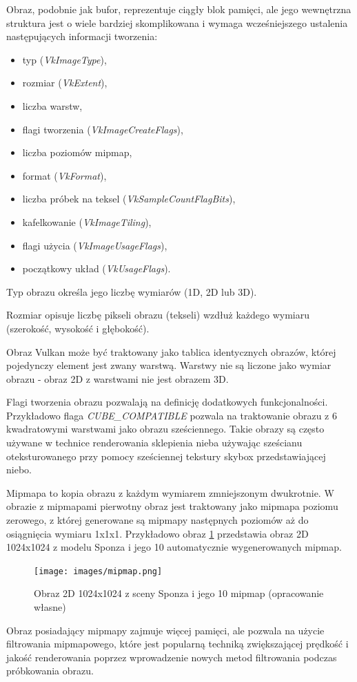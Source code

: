 Obraz, podobnie jak bufor, reprezentuje ciągły blok pamięci, ale jego wewnętrzna struktura jest o wiele bardziej skomplikowana i wymaga wcześniejszego ustalenia następujących informacji tworzenia:
\begin{itemize}
	\item typ (\textit{VkImageType}),
	\item rozmiar (\textit{VkExtent}),
	\item liczba warstw,
	\item flagi tworzenia (\textit{VkImageCreateFlags}),
	\item liczba poziomów mipmap,
	\item format (\textit{VkFormat}),
	\item liczba próbek na teksel (\textit{VkSampleCountFlagBits}),
	\item kafelkowanie (\textit{VkImageTiling}),
	\item flagi użycia (\textit{VkImageUsageFlags}),
	\item początkowy układ (\textit{VkUsageFlags}).
\end{itemize}

Typ obrazu określa jego liczbę wymiarów (1D, 2D lub 3D).

Rozmiar opisuje liczbę pikseli obrazu (tekseli) wzdłuż każdego wymiaru (szerokość, wysokość i głębokość).

Obraz Vulkan może być traktowany jako tablica identycznych obrazów, której pojedynczy element jest zwany warstwą. Warstwy nie są liczone jako wymiar obrazu - obraz 2D z warstwami nie jest obrazem 3D.

Flagi tworzenia obrazu pozwalają na definicję dodatkowych funkcjonalności. Przykładowo flaga \textit{CUBE\_COMPATIBLE} pozwala na traktowanie obrazu z 6 kwadratowymi warstwami jako obrazu sześciennego.
Takie obrazy są często używane w technice renderowania sklepienia nieba używając sześcianu oteksturowanego przy pomocy sześciennej tekstury skybox przedstawiającej niebo.

Mipmapa to kopia obrazu z każdym wymiarem zmniejszonym dwukrotnie.
W obrazie z mipmapami pierwotny obraz jest traktowany jako mipmapa poziomu zerowego, z której generowane są mipmapy następnych poziomów aż do osiągnięcia wymiaru 1x1x1.
Przykładowo obraz \ref{mipmap} przedstawia obraz 2D 1024x1024 z modelu Sponza \cite{GLTFSAMPLEMODELS} i jego 10 automatycznie wygenerowanych mipmap.
\begin{figure}[htbp]
	\centering
	\texttt{[image: images/mipmap.png]}
	\caption{Obraz 2D 1024x1024 z sceny Sponza \cite{GLTFSAMPLEMODELS} i jego 10 mipmap (opracowanie własne)}
	\label{mipmap}
\end{figure}
Obraz posiadający mipmapy zajmuje więcej pamięci, ale pozwala na użycie filtrowania mipmapowego, które jest popularną techniką zwiększającej prędkość i jakość renderowania poprzez wprowadzenie nowych metod filtrowania podczas próbkowania obrazu.

